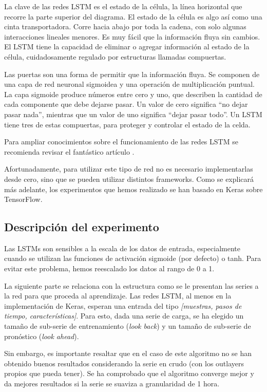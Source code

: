 \documentclass[]{book}
\begin{document}
La clave de las redes LSTM es el estado de la célula, la línea
horizontal que recorre la parte superior del diagrama. El estado de la
célula es algo así como una cinta transportadora. Corre hacia abajo por
toda la cadena, con solo algunas interacciones lineales menores. Es muy
fácil que la información fluya sin cambios. El LSTM tiene la capacidad
de eliminar o agregar información al estado de la célula, cuidadosamente
regulado por estructuras llamadas compuertas.

Las puertas son una forma de permitir que la información fluya. Se
componen de una capa de red neuronal sigmoidea y una operación de
multiplicación puntual. La capa sigmoide produce números entre cero y
uno, que describen la cantidad de cada componente que debe dejarse
pasar. Un valor de cero significa ``no dejar pasar nada'', mientras que
un valor de uno significa ``dejar pasar todo''. Un LSTM tiene tres de
estas compuertas, para proteger y controlar el estado de la celda.

Para ampliar conocimientos sobre el funcionamiento de las redes LSTM se
recomienda revisar el fantástico artículo \citep{olah2015lstm}.

Afortunadamente, para utilizar este tipo de red no es necesario
implementarlas desde cero, sino que se pueden utilizar distintos
frameworks. Como se explicará más adelante, los experimentos que hemos
realizado se han basado en Keras sobre TensorFlow.

\subsection{Descripción del
experimento}\label{descripcion-del-experimento}

Las LSTMs son sensibles a la escala de los datos de entrada,
especialmente cuando se utilizan las funciones de activación sigmoide
(por defecto) o tanh. Para evitar este problema, hemos reescalado los
datos al rango de 0 a 1.

La siguiente parte se relaciona con la estructura como se le presentan
las series a la red para que proceda al aprendizaje. Las redes LSTM, al
menos en la implementación de Keras, esperan una entrada del tipo
\emph{{[}muestras, pasos de tiempo, características{]}}. Para esto, dada
una serie de carga, se ha elegido un tamaño de sub-serie de
entrenamiento (\emph{look back}) y un tamaño de sub-serie de pronóstico
(\emph{look ahead}).

Sin embargo, es importante resaltar que en el caso de este algoritmo no
se han obtenido buenos resultados considerando la serie en crudo (con
los outlayers propios que pueda tener). Se ha comprobado que el
algoritmo converge mejor y da mejores resultados si la serie se suaviza
a granularidad de 1 hora.
\end{document}
